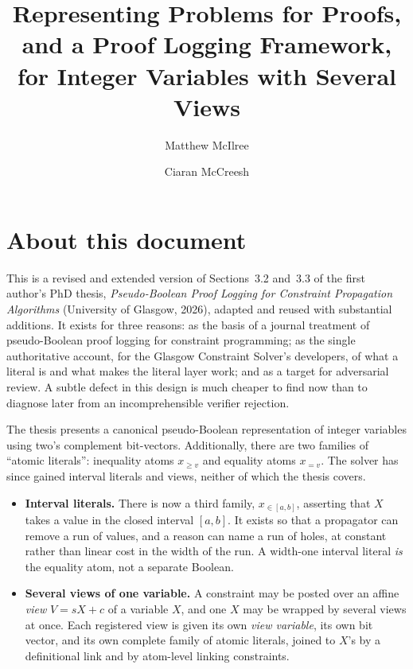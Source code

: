 \documentclass[11pt,a4paper]{article}
\title{Representing Problems for Proofs, and a Proof Logging Framework,\\
  for Integer Variables with Several Views}
\author{Matthew McIlree \and Ciaran McCreesh}
\date{}
\theoremstyle{plain}
\theoremstyle{definition}
\theoremstyle{remark}
\newcommand{\atge}[2]{#1_{\geq #2}}
\newcommand{\ateq}[2]{#1_{= #2}}
\newcommand{\atin}[3]{#1_{\in[#2,#3]}}
\begin{document}
\maketitle

\section*{About this document}

This is a revised and extended version of Sections~3.2 and~3.3 of the first
author's PhD thesis, \emph{Pseudo-Boolean Proof Logging for Constraint
Propagation Algorithms} (University of Glasgow, 2026), adapted and reused with
substantial additions.  It exists for three reasons: as the basis of a journal
treatment of pseudo-Boolean proof logging for constraint programming; as the
single authoritative account, for the Glasgow Constraint Solver's developers, of
what a literal is and what makes the literal layer work; and as a target for
adversarial review.  A subtle defect in this design is much cheaper to find now
than to diagnose later from an incomprehensible verifier rejection.

The thesis presents a canonical pseudo-Boolean representation of integer
variables using two's complement bit-vectors.  Additionally, there are two
families of ``atomic literals'': inequality atoms $\atge{x}{v}$ and equality
atoms $\ateq{x}{v}$.  The solver has since gained interval literals and views,
neither of which the thesis covers.

\begin{itemize}
  \item \textbf{Interval literals.}  There is now a third family, $\atin{x}{a}{b}$,
    asserting that $X$ takes a value in the closed interval $[a,b]$.  It exists so
    that a propagator can remove a run of values, and a reason can name a run of
    holes, at constant rather than linear cost in the width of the run.  A
    width-one interval literal \emph{is} the equality atom, not a separate
    Boolean.
  \item \textbf{Several views of one variable.}  A constraint may be
    posted over an affine \emph{view} $V = sX+c$ of a variable $X$, and one $X$
    may be wrapped by several views at once.  Each registered view is given its
    own \emph{view variable}, its own bit vector, and its own complete family of
    atomic literals, joined to $X$'s by a definitional link and by atom-level
    linking constraints.
\end{itemize}
\end{document}

